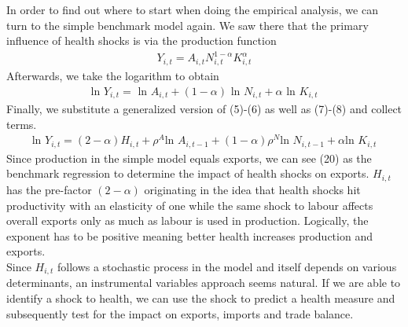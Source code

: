 \documentclass{article}
\begin{document}
In order to find out where to start when doing the empirical analysis, we can turn to the simple benchmark model again. We saw there that the primary influence of health shocks is via the production function
\begin{align}
Y_{i, t} = A_{i, t} N_{i, t}^{1 - \alpha} K_{i, t}^{\alpha}
\end{align}
Afterwards, we take the logarithm to obtain
\begin{align}
\text{ln } Y_{i, t} = \text{ ln } A_{i, t} + (1 - \alpha) \text{ ln } N_{i, t} + \alpha \text{ ln } K_{i, t}
\end{align}
Finally, we substitute a generalized version of (5)-(6) as well as (7)-(8) and collect terms.
\begin{align}
\text{ln } Y_{i, t} = (2 - \alpha)H_{i, t} + \rho^A \text{ln } A_{i, t-1} + (1 - \alpha) \rho^N \text{ln } N_{i, t-1} + \alpha \text{ln } K_{i, t}
\end{align}
Since production in the simple model equals exports, we can see (20) as the benchmark regression to determine the impact of health shocks on exports. $H_{i, t}$ has the pre-factor $(2 - \alpha)$ originating in the idea that health shocks hit productivity with an elasticity of one while the same shock to labour affects overall exports only as much as labour is used in production. Logically, the exponent has to be positive meaning better health increases production and exports. \\
Since $H_{i, t}$ follows a stochastic process in the model and itself depends on various determinants, an instrumental variables approach seems natural. If we are able to identify a shock to health, we can use the shock to predict a health measure and subsequently test for the impact on exports, imports and trade balance. \\
\end{document}
